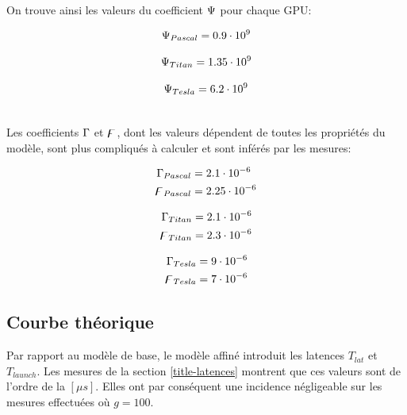 \noindent On trouve ainsi les valeurs du coefficient $\Psi$ pour chaque \acs{GPU}:\\

\noindent\begin{minipage}{.33\linewidth}
	\begin{equation*}
	\Psi_{Pascal} = 0.9 \cdot 10^9
	\end{equation*}
\end{minipage}%
\begin{minipage}{.33\linewidth}
	\begin{equation*}
	\Psi_{Titan} = 1.35 \cdot 10^9
	\end{equation*}
\end{minipage}
\begin{minipage}{.33\linewidth}
	\begin{equation*}
	\Psi_{Tesla}  = 6.2 \cdot 10^9
	\end{equation*}
\end{minipage}\\[\baselineskip]

\noindent Les coefficients $\Gamma $ et $\digamma $, dont les valeurs dépendent de toutes les propriétés du modèle, sont plus compliqués à calculer et sont inférés par les mesures: 

\noindent\begin{minipage}{.33\linewidth}
\begin{align*}
\Gamma_{Pascal} &= 2.1\cdot 10^{-6}\\
\digamma_{Pascal} &= 2.25\cdot 10^{-6}\\
\end{align*}
\end{minipage}%
\begin{minipage}{.33\linewidth}
\begin{align*}
\Gamma_{Titan} &= 2.1\cdot 10^{-6}\\
\digamma_{Titan} &= 2.3\cdot 10^{-6}\\
\end{align*}
\end{minipage}%
\begin{minipage}{.33\linewidth}
\begin{align*}
\Gamma_{Tesla} &= 9\cdot 10^{-6}\\
\digamma_{Tesla} &= 7\cdot 10^{-6}\\
\end{align*}
\end{minipage}

\subsection{Courbe théorique}
Par rapport au modèle de base, le modèle affiné introduit les latences $T_{lat}$ et $T_{launch}$. Les mesures de la section \ref{title-latences} montrent que ces valeurs sont de l'ordre de la $[\mu s]$. Elles ont par conséquent une incidence négligeable sur les mesures effectuées où $g=100$.


